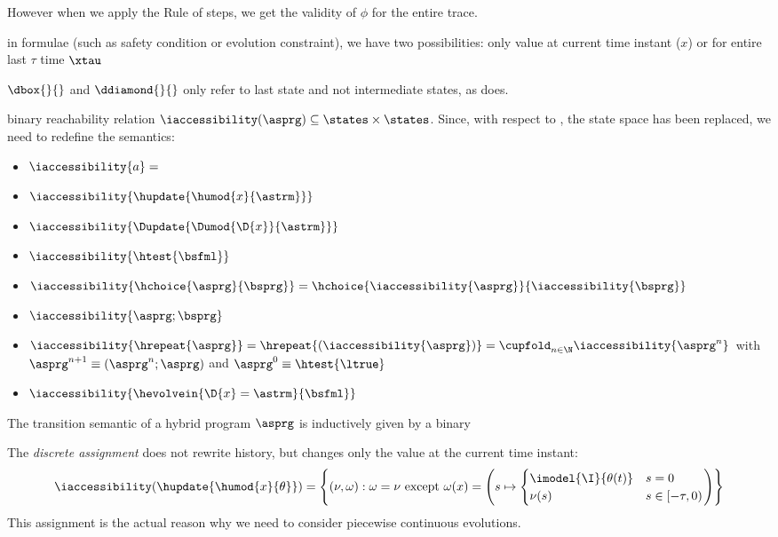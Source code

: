         However when we apply the Rule of steps, we get the validity of $\phi$ for the entire trace.

        in formulae (such as safety condition or evolution constraint), we have two possibilities: only value at current time instant ($x$) or for entire last $\tau$ time $\xtau$

        $\dbox{}{}$ and $\ddiamond{}{}$ only refer to last state and not intermediate states, as \dTL does.


    \begin{definition}
        \label{def:semantic-HP}

         binary reachability relation $\iaccessibility(\asprg)\subseteq\states\times\states$. Since, with respect to \dL, the state space has been replaced, we need to redefine the semantics:
        \begin{itemize}
            \item $\iaccessibility{a} = $
            \item $\iaccessibility{\hupdate{\humod{x}{\astrm}}}$
            \item $\iaccessibility{\Dupdate{\Dumod{\D{x}}{\astrm}}} $
            \item $\iaccessibility{\htest{\bsfml}}$
            \item $\iaccessibility{\hchoice{\asprg}{\bsprg}} = \hchoice{\iaccessibility{\asprg}}{\iaccessibility{\bsprg}}$
            \item $\iaccessibility{\asprg;\bsprg} $
            \item $\iaccessibility{\hrepeat{\asprg}} = \hrepeat{(\iaccessibility{\asprg})} = \cupfold_{n\in\N}\iaccessibility{\asprg^n}$ with $\asprg^{n+1}\equiv (\asprg^n;\asprg)$ and $\asprg^0\equiv \htest{\ltrue}$
            \item $\iaccessibility{\hevolvein{\D{x}=\astrm}{\bsfml}}$
        \end{itemize}

    \end{definition}

        The transition semantic of a hybrid program $\asprg$ is inductively given by a binary

        The \emph{discrete assignment} does not rewrite history, but changes only the value at the current time instant:
        \begin{equation}
            \iaccessibility(\hupdate{\humod{x}{\theta}}) =
                \left\{(\nu,\omega): \omega = \nu \text{ except }
                \omega(x) = \left(s\mapsto\begin{cases}
                    \imodel{\I}{\theta(t)} & s=0\\
                    \nu(s) & s\in[-\tau,0)
                \end{cases}\right)\right\}
        \end{equation}
        This assignment is the actual reason why we need to consider piecewise continuous evolutions.

